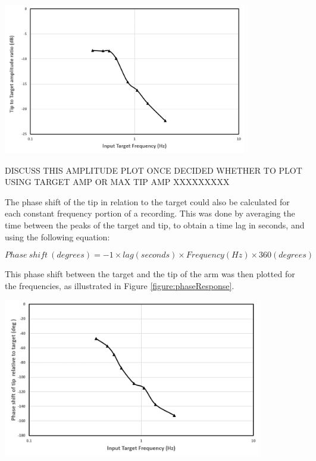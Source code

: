 \documentclass[11pt]{article}
\begin{document}
\begin{center}
\includegraphics[width=0.8\textwidth]{images/amplitudeResponse.png}
\label{figure:amplitudeResponse}
\end{center}

DISCUSS THIS AMPLITUDE PLOT ONCE DECIDED WHETHER TO PLOT USING TARGET AMP OR MAX TIP AMP XXXXXXXXX


\pagebreak
The phase shift of the tip in relation to the target could also be calculated for each constant frequency portion of a recording. This was done by averaging the time between the peaks of the target and tip, to obtain a time lag in seconds, and using the following equation:

\begin{equation}\label{equation:phaseShift}
Phase \ shift \ (degrees) = -1 \times lag(seconds)\times Frequency(Hz)\times 360(degrees)
\end{equation}

This phase shift between the target and the tip of the arm was then plotted for the frequencies, as illustrated in Figure \ref{figure:phaseResponse}.

\begin{center}
\includegraphics[width=0.85\textwidth]{images/phaseResponse2.png}
\label{figure:phaseResponse}
\end{center}
\end{document}
